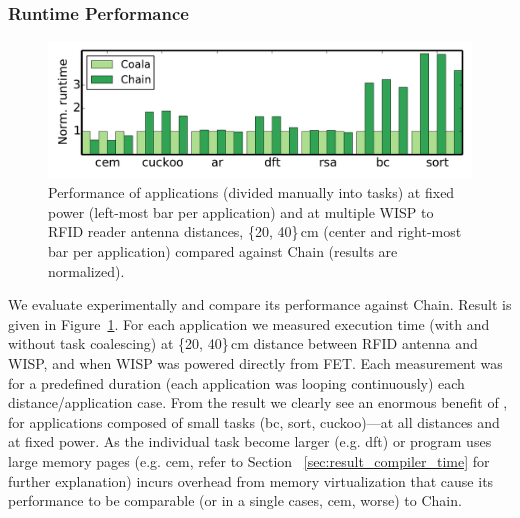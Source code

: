 
\subsubsection{\sys Runtime Performance}
\label{sec:result_coalescing}

\begin{figure}
	\centering
	\includegraphics[width=\columnwidth]{figures/coala_chain_clang}
	\caption{Performance of \sys applications (divided manually into tasks) at fixed power (left-most bar per application) and at multiple WISP to RFID reader antenna distances, \{20, 40\}\,cm (center and right-most bar per application) compared against Chain (results are normalized).}
	\label{fig:runtime}
\end{figure}

We evaluate \sys experimentally and compare its performance against Chain. Result is given in Figure~\ref{fig:runtime}. For each application we measured execution time (with and without task coalescing) at \{20, 40\}\,cm distance between RFID antenna and WISP, and when WISP was powered directly from FET. Each measurement was for a predefined duration (each application was looping continuously) each distance/application case. From the result we clearly see an enormous benefit of \sys, for applications composed of small tasks (bc, sort, cuckoo)---at all distances and at fixed power. As the individual task become larger (e.g. dft) or program uses large memory pages (e.g. cem, refer to Section~
\ref{sec:result_compiler_time} for further explanation) \sys incurs overhead from memory virtualization that cause its performance to be comparable (or in a single cases, cem, worse) to Chain. 

